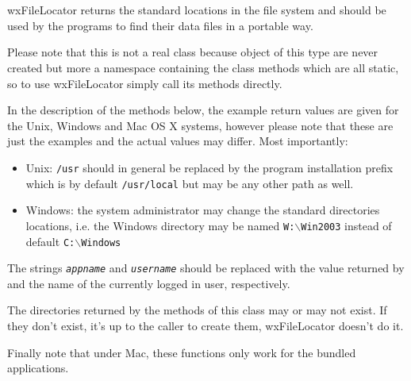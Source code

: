 
\section{}\label{wxfilelocator}

wxFileLocator returns the standard locations in the file system and should be
used by the programs to find their data files in a portable way.

Please note that this is not a real class because object of this type are never
created but more a namespace containing the class methods which are all static,
so to use wxFileLocator simply call its methods directly.

In the description of the methods below, the example return values are given
for the Unix, Windows and Mac OS X systems, however please note that these are
just the examples and the actual values may differ. Most importantly:
\begin{itemize}
    \item Unix: \texttt{/usr} should in general be replaced by the
        program installation prefix which is by default \texttt{/usr/local} but
        may be any other path as well.
    \item Windows: the system administrator may change the standard
        directories locations, i.e. the Windows directory may be named
        \texttt{W:$\backslash$Win2003} instead of default
        \texttt{C:$\backslash$Windows}
\end{itemize}

The strings \texttt{\textit{appname}} and \texttt{\textit{username}} should be
replaced with the value returned by  
and the name of the currently logged in user, respectively.

The directories returned by the methods of this class may or may not exist. If
they don't exist, it's up to the caller to create them, wxFileLocator doesn't
do it.

Finally note that under Mac, these functions only work for the bundled
applications.

